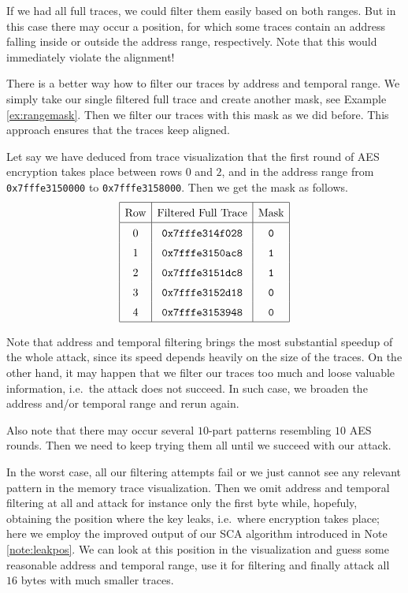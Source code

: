 		If we had all full traces, we could filter them easily based on both ranges. But in this case there may occur a position, for which some traces contain an address falling inside or outside the address range, respectively. Note that this would immediately violate the alignment!
		
		\begin{remark}
		\label{rem:rangemask}
			There is a better way how to filter our traces by address and temporal range. We simply take our single filtered full trace and create another mask, see Example \ref{ex:rangemask}. Then we filter our traces with this mask as we did before. This approach ensures that the traces keep aligned.
		\end{remark}
		
		\begin{example}
		\label{ex:rangemask}
			Let say we have deduced from trace visualization that the first round of AES encryption takes place between rows $0$ and $2$, and in the address range from {\tt 0x7fffe3150000} to {\tt 0x7fffe3158000}. Then we get the mask as follows.
			\[
			\arraycolsep=.5em\def\arraystretch{1.5}
				\begin{array}{|c|c|c|}
					\hline
					\textnormal{Row} & \textnormal{Filtered Full Trace} & \textnormal{Mask} \\
					\hline
					0 & {\tt 0x7fffe314f028} & {\tt 0} \\
					1 & {\tt 0x7fffe3150ac8} & {\tt 1} \\
					2 & {\tt 0x7fffe3151dc8} & {\tt 1} \\
					3 & {\tt 0x7fffe3152d18} & {\tt 0} \\
					4 & {\tt 0x7fffe3153948} & {\tt 0} \\
					\hline
				\end{array}
			\]
		\end{example}
		
		Note that address and temporal filtering brings the most substantial speedup of the whole attack, since its speed depends heavily on the size of the traces. On the other hand, it may happen that we filter our traces too much and loose valuable information, i.e.\ the attack does not succeed. In such case, we broaden the address and/or temporal range and rerun again.
		
		Also note that there may occur several $10$-part patterns resembling $10$ AES rounds. Then we need to keep trying them all until we succeed with our attack.
		
		In the worst case, all our filtering attempts fail or we just cannot see any relevant pattern in the memory trace visualization. Then we omit address and temporal filtering at all and attack for instance only the first byte while, hopefuly, obtaining the position where the key leaks, i.e.\ where encryption takes place; here we employ the improved output of our SCA algorithm introduced in Note \ref{note:leakpos}. We can look at this position in the visualization and guess some reasonable address and temporal range, use it for filtering and finally attack all $16$ bytes with much smaller traces.


